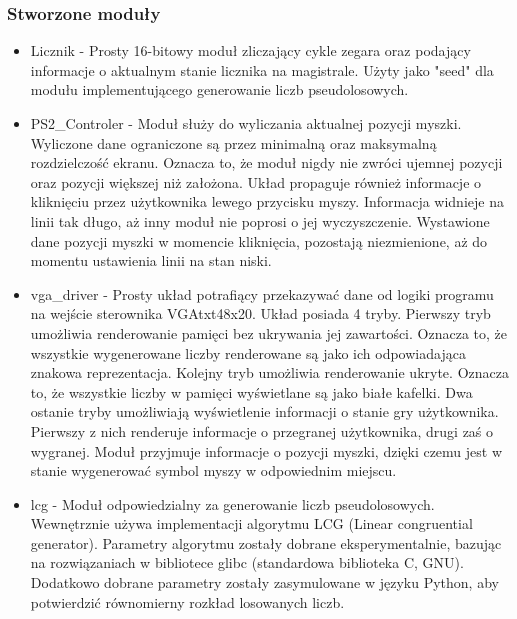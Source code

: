 \documentclass[polish,polish,a4paper]{article}
\begin{document}
\subsubsection{Stworzone moduły}
\begin{itemize}
 \item
  Licznik - Prosty 16-bitowy moduł zliczający cykle zegara oraz podający informacje o aktualnym stanie licznika na magistrale.
  Użyty jako "seed" dla modułu implementującego generowanie liczb pseudolosowych.

 \item
  PS2\_Controler - Moduł służy do wyliczania aktualnej pozycji myszki.
  Wyliczone dane ograniczone są przez minimalną oraz maksymalną rozdzielczość ekranu.
  Oznacza to, że moduł nigdy nie zwróci ujemnej pozycji oraz pozycji większej niż założona.
  Układ propaguje również informacje o kliknięciu przez użytkownika lewego przycisku myszy.
  Informacja widnieje na linii tak długo, aż inny moduł nie poprosi o jej wyczyszczenie.
  Wystawione dane pozycji myszki w momencie kliknięcia, pozostają niezmienione, aż do momentu ustawienia linii na stan niski. 

 \item
  vga\_driver - Prosty układ potrafiący przekazywać dane od logiki programu na wejście sterownika VGAtxt48x20.
  Układ posiada 4 tryby.
  Pierwszy tryb umożliwia renderowanie pamięci bez ukrywania jej zawartości.
  Oznacza to, że wszystkie wygenerowane liczby renderowane są jako ich odpowiadająca znakowa reprezentacja.
  Kolejny tryb umożliwia renderowanie ukryte.
  Oznacza to, że wszystkie liczby w pamięci wyświetlane są jako białe kafelki.
  Dwa ostanie tryby umożliwiają wyświetlenie informacji o stanie gry użytkownika.
  Pierwszy z nich renderuje informacje o przegranej użytkownika, drugi zaś o wygranej.
  Moduł przyjmuje informacje o pozycji myszki, dzięki czemu jest w stanie wygenerować symbol myszy w odpowiednim miejscu.

 \item
  lcg - Moduł odpowiedzialny za generowanie liczb pseudolosowych.
  Wewnętrznie używa implementacji algorytmu LCG (Linear congruential generator).
  Parametry algorytmu zostały dobrane eksperymentalnie, bazując na rozwiązaniach w bibliotece glibc (standardowa biblioteka C, GNU).
  Dodatkowo dobrane parametry zostały zasymulowane w języku Python, aby potwierdzić równomierny rozkład losowanych liczb.


\end{itemize}
\end{document}
